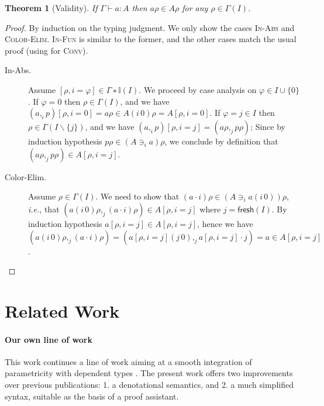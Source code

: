 \documentclass[english]{PaperTools/latex/entcs}
\theoremstyle{plain}
\newtheorem{theorem}{Theorem}
\theoremstyle{definition}
\theoremstyle{remark}
\newcommand\op[1]{∋_{#1}}
\def\fresh#1{\mathsf{fresh}(#1)}
\def\ie{\textit{i.e.}}
\begin{document}
\begin{theorem}[Validity]
  If $Γ ⊢ a : A$ then $aρ ∈ Aρ$ for any $ρ ∈ Γ(I)$.
\end{theorem}\vspace{-.5\baselineskip}
\begin{proof}
  By induction on the typing judgment.  We only show the cases \textsc{In-Abs} and \textsc{Color-Elim}.  \textsc{In-Fun} is similar to the former, and the other
  cases match the usual proof (using  for \textsc{Conv}).
  \begin{description}
    \item[\sc In-Abs.]
      Assume $[ρ,i=φ] ∈ Γ∗𝕀(I)$.  We proceed by case analysis on $φ ∈ I ∪ \{0\}$.
      If $φ = 0$ then $ρ ∈ Γ(I)$, and we have
      $(a ,_i p)[ρ,i=0] = aρ ∈ A(i\,0)ρ = A[ρ,i=0]$.
      If $φ = j ∈ I$ then $ρ ∈ Γ(I\backslash\{j\})$, and we have
      $(a ,_i p)[ρ,i=j] = (aρ ,_j pρ)$;
      Since by induction hypothesis $pρ ∈ (A \op {i} a)ρ$, we conclude
      by definition that $(aρ ,_j pρ) ∈ A[ρ,i=j]$.

    \item[\sc Color-Elim.]
      Assume $ρ ∈ Γ(I)$.
      We need to show that $(a·i)ρ ∈ (A \op i {a(i\,0)})ρ$, \ie, that
      $ (a(i\,0)ρ ,_j (a·i)ρ) ∈ A[ρ,i=j]$ where $j = \fresh I$.
      By induction hypothesis $a[ρ,i=j] ∈ A[ρ,i=j]$, hence
      we have
      $(a(i\,0)ρ ,_j (a·i)ρ) = (a[ρ,i=j](j\,0) ,_j a[ρ,i=j]·j) = a ∈ A[ρ,i=j]$.
    \qedhere
  \end{description}

\end{proof}

\section{Related Work}

\paragraph{Our own line of work}
This work continues a line of work aiming at a smooth integration of
parametricity with dependent types
\citep{bernardy_parametricity_2010,bernardy_realizability_2011,bernardy_proofs_2012,bernardy_computational_2012,bernardy_type-theory_2013}. The present work offers two improvements over previous publications:
1. a denotational semantics, and
2. a much simplified syntax, suitable as the basis of a proof assistant.
\end{document}

